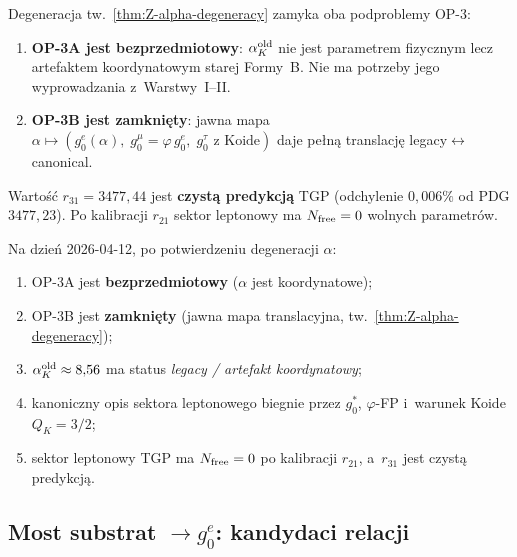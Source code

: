 \begin{corollary}
\label{cor:Z-OP3-closed}
Degeneracja tw.~\ref{thm:Z-alpha-degeneracy} zamyka oba
podproblemy OP-3:
\begin{enumerate}[nosep]
  \item \textbf{OP-3A jest bezprzedmiotowy}: $\alpha_K^{\rm old}$
    nie jest parametrem fizycznym lecz artefaktem koordynatowym
    starej Formy~B. Nie ma potrzeby jego wyprowadzania z~Warstwy~I--II.
  \item \textbf{OP-3B jest zamkni\k{e}ty}: jawna mapa
    $\alpha \mapsto (g_0^e(\alpha),\; g_0^\mu = \varphi\,g_0^e,\;
    g_0^\tau\text{ z Koide})$
    daje pe\l{}n\k{a} translacj\k{e} legacy$\leftrightarrow$canonical.
\end{enumerate}
\end{corollary}

\begin{remark}[Predykcja $r_{31}$]
\label{rem:Z-r31-prediction}
Warto\'s\'c $r_{31} = 3477{,}44$ jest \textbf{czyst\k{a} predykcj\k{a}}
TGP (odchylenie $0{,}006\%$ od PDG $3477{,}23$).
Po kalibracji $r_{21}$ sektor leptonowy ma
$N_{\rm free} = 0$ wolnych parametr\'ow.
\end{remark}

\begin{theorem}
\label{thm:Z-main-status}
Na dzie\'n 2026-04-12, po potwierdzeniu degeneracji $\alpha$:
\begin{enumerate}[nosep]
  \item OP-3A jest \textbf{bezprzedmiotowy}
    ($\alpha$ jest koordynatowe);
  \item OP-3B jest \textbf{zamkni\k{e}ty}
    (jawna mapa translacyjna, tw.~\ref{thm:Z-alpha-degeneracy});
  \item $\alpha_K^{\rm old} \approx 8{,}56$ ma status
    \emph{legacy / artefakt koordynatowy};
  \item kanoniczny opis sektora leptonowego biegnie przez
    $g_0^*$, $\varphi$-FP i~warunek Koide $Q_K = 3/2$;
  \item sektor leptonowy TGP ma $N_{\rm free} = 0$
    po kalibracji $r_{21}$, a~$r_{31}$ jest czyst\k{a} predykcj\k{a}.
\end{enumerate}
\end{theorem}

\subsection{Most substrat $\to g_0^e$: kandydaci relacji}
\label{app:Z-substrate-bridge}

